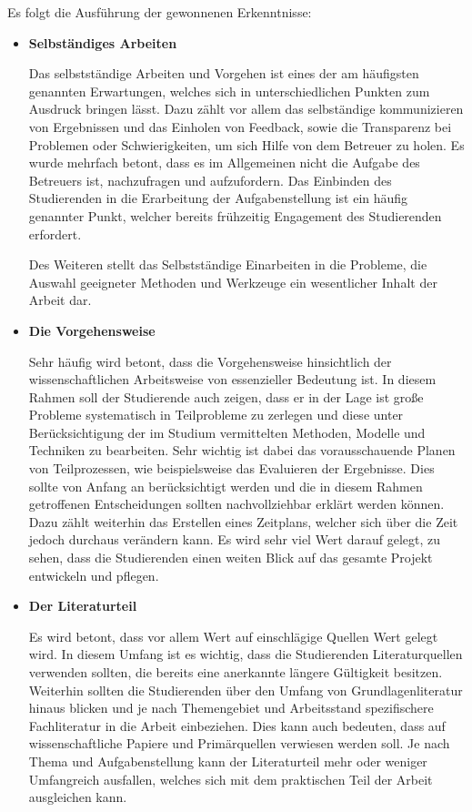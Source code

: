 \documentclass{scrreprt}
\begin{document}
\par Es folgt die Ausführung der gewonnenen Erkenntnisse:
\begin{itemize}
\item \textbf{Selbständiges Arbeiten}
\par Das selbstständige Arbeiten und Vorgehen ist eines der am häufigsten genannten Erwartungen, welches sich in unterschiedlichen Punkten zum Ausdruck bringen lässt. Dazu zählt vor allem das selbständige kommunizieren von Ergebnissen und das Einholen von Feedback, sowie die Transparenz bei Problemen oder Schwierigkeiten, um sich Hilfe von dem Betreuer zu holen. Es wurde mehrfach betont, dass es im Allgemeinen nicht die Aufgabe des Betreuers ist, nachzufragen und aufzufordern. Das Einbinden des Studierenden in die Erarbeitung der Aufgabenstellung ist ein häufig genannter Punkt, welcher bereits frühzeitig Engagement des Studierenden erfordert.
\par Des Weiteren stellt das Selbstständige Einarbeiten in die Probleme, die Auswahl geeigneter Methoden und Werkzeuge ein wesentlicher Inhalt der Arbeit dar.
\item \textbf{Die Vorgehensweise}
\par Sehr häufig wird betont, dass die Vorgehensweise hinsichtlich der wissenschaftlichen Arbeitsweise von essenzieller Bedeutung ist. In diesem Rahmen soll der Studierende auch zeigen, dass er in der Lage ist große Probleme systematisch in Teilprobleme zu zerlegen und diese unter Berücksichtigung der im Studium vermittelten Methoden, Modelle und Techniken zu bearbeiten. Sehr wichtig ist dabei das vorausschauende Planen von Teilprozessen, wie beispielsweise das Evaluieren der Ergebnisse. Dies sollte von Anfang an berücksichtigt werden und die in diesem Rahmen getroffenen Entscheidungen sollten nachvollziehbar erklärt werden können. Dazu zählt weiterhin das Erstellen eines Zeitplans, welcher sich über die Zeit jedoch durchaus verändern kann. Es wird sehr viel Wert darauf gelegt, zu sehen, dass die Studierenden einen weiten Blick auf das gesamte Projekt entwickeln und pflegen.
\item \textbf{Der Literaturteil}
\par Es wird betont, dass vor allem Wert auf einschlägige Quellen Wert gelegt wird. In diesem Umfang ist es wichtig, dass die Studierenden Literaturquellen verwenden sollten, die bereits eine anerkannte längere Gültigkeit besitzen. Weiterhin sollten die Studierenden über den Umfang von Grundlagenliteratur hinaus blicken und je nach Themengebiet und Arbeitsstand spezifischere Fachliteratur in die Arbeit einbeziehen. Dies kann auch bedeuten, dass auf wissenschaftliche Papiere und Primärquellen verwiesen werden soll. Je nach Thema und Aufgabenstellung kann der Literaturteil mehr oder weniger Umfangreich ausfallen, welches sich mit dem praktischen Teil der Arbeit ausgleichen kann.

\end{itemize}
\end{document}
